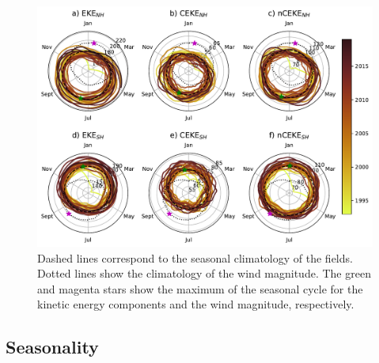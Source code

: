 \documentclass[draft]{agujournal2019}
\begin{document}
	\begin{figure}
	    \centering
	    \includegraphics[width=1\textwidth]{figures/All_polar_plots.pdf}
	    \caption{Dashed lines correspond to the seasonal climatology of the fields. Dotted lines show the climatology of the wind magnitude. The green and magenta stars show the maximum of the seasonal cycle for the kinetic energy components and the wind magnitude, respectively. }
	    \label{fig:my_label}
	\end{figure}
	
	\subsection{Seasonality}
	\label{subsec:R_season}
	

	


\end{document}
